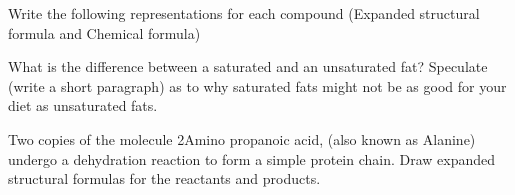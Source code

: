 \documentclass[addpoints, 12pt]{exam}
\begin{document}
\begin{questions}

\question[32] Write the following representations for each compound
(Expanded structural formula   and   Chemical formula)


\question[10] What is the difference between a saturated and an
unsaturated fat?  Speculate (write a short paragraph) as to why
saturated fats might not be as good for your diet as unsaturated fats.


\question[10] Two copies of the molecule 2Amino propanoic acid, (also
known as Alanine) undergo a dehydration reaction to form a simple
protein chain.  Draw expanded structural formulas for the reactants
and products.



\end{questions}
\end{document}

